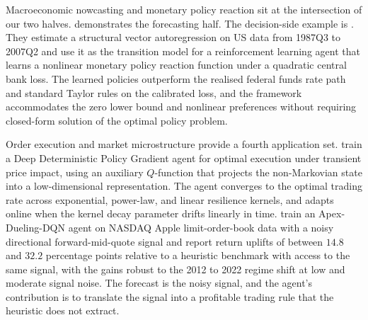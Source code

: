 Macroeconomic nowcasting and monetary policy reaction sit at the intersection of
our two halves. \citet{Fernandes2024} demonstrates the forecasting half. The
decision-side example is \citet{HinterlangTaenzer2024}. They estimate a structural
vector autoregression on US data from 1987Q3 to 2007Q2 and use it as the
transition model for a reinforcement learning agent that learns a nonlinear
monetary policy reaction function under a quadratic central bank loss. The
learned policies outperform the realised federal funds rate path and standard
Taylor rules on the calibrated loss, and the framework accommodates the zero
lower bound and nonlinear preferences without requiring closed-form solution
of the optimal policy problem.

Order execution and market microstructure provide a fourth application set.
\citet{MicheliMonod2024} train a Deep Deterministic Policy Gradient agent for
optimal execution under transient price impact, using an auxiliary $Q$-function
that projects the non-Markovian state into a low-dimensional representation. The
agent converges to the optimal trading rate across exponential, power-law, and
linear resilience kernels, and adapts online when the kernel decay parameter
drifts linearly in time. \citet{Briola2023} train an Apex-Dueling-DQN agent on
NASDAQ Apple limit-order-book data with a noisy directional forward-mid-quote
signal and report return uplifts of between $14.8$ and $32.2$ percentage points
relative to a heuristic benchmark with access to the same signal, with the gains
robust to the 2012 to 2022 regime shift at low and moderate signal noise. The
forecast is the noisy signal, and the agent's contribution is to translate the
signal into a profitable trading rule that the heuristic does not extract.
